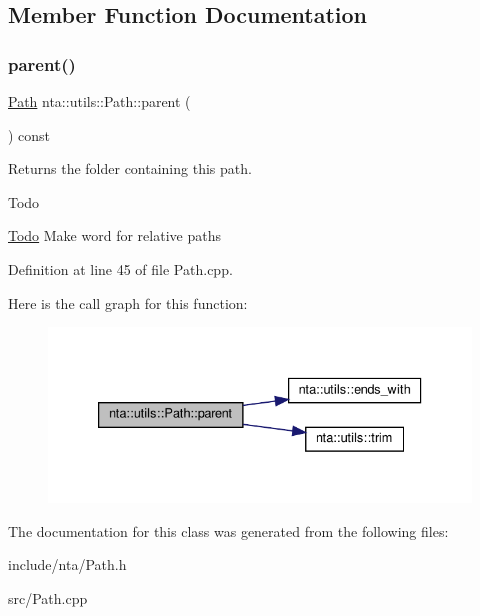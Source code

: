 \subsection{Member Function Documentation}
\mbox{\label{classnta_1_1utils_1_1Path_aa124dc05466b3f681d02579fa0022a6a}} 
\subsubsection{\texorpdfstring{parent()}{parent()}}
{\footnotesize\ttfamily \hyperlink{classnta_1_1utils_1_1Path}{Path} nta\+::utils\+::\+Path\+::parent (\begin{DoxyParamCaption}{ }\end{DoxyParamCaption}) const}



Returns the folder containing this path. 

\begin{DoxyRefDesc}{Todo}
\item[\hyperlink{todo__todo000026}{Todo}]Make word for relative paths \end{DoxyRefDesc}


Definition at line 45 of file Path.\+cpp.

Here is the call graph for this function\+:
\nopagebreak
\begin{figure}[H]
\begin{center}
\leavevmode
\includegraphics[width=333pt]{dc/d05/classnta_1_1utils_1_1Path_aa124dc05466b3f681d02579fa0022a6a_cgraph}
\end{center}
\end{figure}


The documentation for this class was generated from the following files\+:\begin{DoxyCompactItemize}
\item 
include/nta/Path.\+h\item 
src/Path.\+cpp\end{DoxyCompactItemize}
